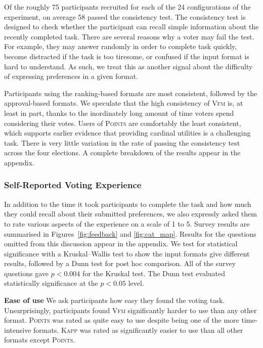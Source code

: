 \documentclass[mnsc,blindrev]{informs3_freeuse} %
\newcommand{\kibitz}[2]{\ifnum\Comments=1{\color{#1}{#2}}\fi}
\newcommand{\gb}[1]{\kibitz{red}{[GB:#1]}}
\newcommand{\points}{\textsc{Points}}
\newcommand{\vfm}{\textsc{Vfm}}
\newcommand{\kapp}{\textsc{Kapp}}
\begin{document}
Of the roughly 75 participants  recruited for each of the 24 configurations of the experiment, on average 58 passed the consistency test. 
%
The consistency test  is designed to check whether the participant can recall simple information about the recently completed task. 
%
There are several reasons why a voter may fail the test. For example, they may answer randomly in order to complete task quickly,  become  distracted  if the task is too tiresome, or confused if the input format is hard to understand. As such, we  treat this as another signal about the difficulty of expressing  preferences in a given format. 

Participants using the ranking-based formats are most consistent, followed by the approval-based formats.  We speculate that the high consistency of \vfm{} is, at least in part, thanks to the inordinately long amount of time voters spend considering their votes. Users of \points{} are comfortably the least consistent, which  supports earlier evidence that providing cardinal utilities is a challenging task.
%
There is very little variation in the rate of passing the consistency test across the four elections. A complete breakdown of the results appear in the appendix. \gb{note-appendix} 

 

\subsubsection{Self-Reported Voting Experience}
In addition to the time it took participants to complete the task and how much they could recall about their submitted preferences, we also expressly asked them to rate various aspects of the experience on a scale of 1 to 5. 
Survey results are summarised in  Figures~\ref{fig:feedback} and \ref{fig:cat_map}. 
Results for the questions omitted from this discussion appear in the appendix. \gb{note-appendix}
We test for statistical significance with a Kruskal–Wallis test to show the input formats give different results, followed by a Dunn test for post hoc comparison.
All of the survey questions   gave $p < 0.004$  for the Kruskal test. The Dunn test evaluated statistically significance   at the $p < 0.05$ level.



\textbf{Ease of use}  We ask participants  how easy they found the voting task. Unsurprisingly, participants found \vfm{} significantly harder to use than any other format. \points{} was rated as quite easy to use despite being one of the more time-intensive formats. \kapp{} was rated as significantly easier to use than all other  formats except \points. 
\end{document}
